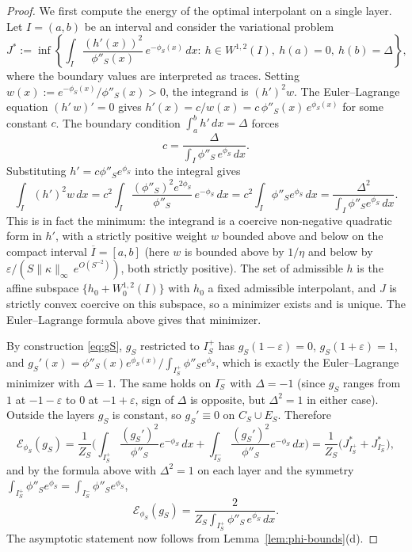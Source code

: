 \begin{proof}
We first compute the energy of the optimal interpolant on a single layer.
Let $I=(a,b)$ be an interval and consider the variational problem
\begin{equation}\label{eq:single-J}
  J^*:=\inf\left\{\int_I\frac{(h'(x))^2}{\phi''_S(x)}\,e^{-\phi_S(x)}\,dx
        :\ h\in W^{1,2}(I),\ h(a)=0,\ h(b)=\Delta\right\},
\end{equation}
where the boundary values are interpreted as traces. Setting
$w(x):=e^{-\phi_S(x)}/\phi''_S(x)>0$, the integrand is $(h')^2 w$.
The Euler--Lagrange equation $(h'\,w)'=0$ gives $h'(x)=c/w(x)
=c\,\phi''_S(x)\,e^{\phi_S(x)}$ for some constant $c$. The boundary condition
$\int_a^b h'\,dx=\Delta$ forces
\[
  c=\frac{\Delta}{\int_I\phi''_S\,e^{\phi_S}\,dx}.
\]
Substituting $h'=c\phi''_S e^{\phi_S}$ into the integral gives
\[
  \int_I (h')^2 w\,dx
  =c^2\int_I\frac{(\phi''_S)^2 e^{2\phi_S}}{\phi''_S}\,e^{-\phi_S}\,dx
  =c^2\int_I\phi''_S e^{\phi_S}\,dx
  =\frac{\Delta^2}{\int_I\phi''_S e^{\phi_S}\,dx}.
\]
This is in fact the minimum: the integrand is a coercive non-negative
quadratic form in $h'$, with a strictly positive weight $w$ bounded above
and below on the compact interval $\overline I=[a,b]$ (here $w$ is bounded
above by $1/\eta$ and below by $\varepsilon/(S\|\kappa\|_\infty\,e^{O(S^{-2})})$,
both strictly positive). The set of admissible $h$ is the affine subspace
$\{h_0+W_0^{1,2}(I)\}$ with $h_0$ a fixed admissible interpolant, and $J$ is
strictly convex coercive on this subspace, so a minimizer exists and is
unique. The Euler--Lagrange formula above gives that minimizer.

By construction \eqref{eq:gS}, $g_S$ restricted to $I_S^+$ has $g_S(1-\varepsilon)
=0$, $g_S(1+\varepsilon)=1$, and
$g_S'(x)=\phi''_S(x)e^{\phi_S(x)}\big/\int_{I_S^+}\phi''_S e^{\phi_S}$,
which is exactly the Euler--Lagrange minimizer with $\Delta=1$. The same holds
on $I_S^-$ with $\Delta=-1$ (since $g_S$ ranges from $1$ at $-1-\varepsilon$
to $0$ at $-1+\varepsilon$, sign of $\Delta$ is opposite, but $\Delta^2=1$ in
either case). Outside the layers $g_S$ is constant, so $g_S'\equiv 0$ on
$C_S\cup E_S$. Therefore
\[
  \mathcal E_{\phi_S}(g_S)
  =\frac{1}{Z_S}\Biggl(\int_{I_S^+}\frac{(g_S')^2}{\phi''_S}e^{-\phi_S}\,dx
                 +\int_{I_S^-}\frac{(g_S')^2}{\phi''_S}e^{-\phi_S}\,dx\Biggr)
  =\frac{1}{Z_S}\bigl(J^*_{I_S^+}+J^*_{I_S^-}\bigr),
\]
and by the formula above with $\Delta^2=1$ on each layer and the symmetry
$\int_{I_S^+}\phi''_S e^{\phi_S}=\int_{I_S^-}\phi''_S e^{\phi_S}$,
\[
  \mathcal E_{\phi_S}(g_S)
  =\frac{2}{Z_S\int_{I_S^+}\phi''_S\,e^{\phi_S}\,dx}.
\]
The asymptotic statement now follows from
Lemma~\ref{lem:phi-bounds}(d).
\end{proof}

